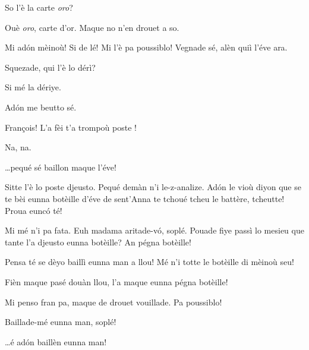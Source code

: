\begin{drama}
\Prosperospeaks {} So l'è la carte \textit{oro}?

\Naimaspeaks Ouè \textit{oro}, carte d'or.  Maque no n'en drouet a so.


\Naimaspeaks {} Mi ad\'on mèinoù! Si de lé! Mi l'è pa poussiblo! Vegnade sé, alèn quiì l'éve ara.


\Francoisspeaks Squezade, qui l'è lo dérì?

\Naimaspeaks Si mé la dériye.

\Francoisspeaks{} Ad\'on me beutto sé.


\Prosperospeaks François! L'a fèi t'a trompoù poste !

\Francoisspeaks Na, na.

\Prosperospeaks \ldots pequé sé baillon maque l'éve!

\Francoisspeaks Sitte l'è lo poste djeusto. Pequé demàn n'i le-z-analize. Ad\'on le vioù diyon que se te bèi eunna botèille d'éve de sent'Anna te tchoué tcheu le battère, tcheutte! Proua eunc\'o té!

\Prosperospeaks Mi mé n'i pa fata.  Euh madama aritade-v\'o, soplé. Pouade fiye passì lo mesieu que tante l'a djeusto eunna botèille? An pégna botèille!

\Naimaspeaks Pensa té se dèyo baillì eunna man a llou! Mé n'i totte le botèille di mèinoù seu!

\Prosperospeaks Fièn maque pasé douàn llou, l'a maque eunna pégna botèille!

\Naimaspeaks Mi penso fran pa, maque de drouet vouillade. Pa poussiblo!

\Prosperospeaks Baillade-mé eunna man, soplé!

\Naimaspeaks \ldots é ad\'on baillèn eunna man!



\end{drama}
